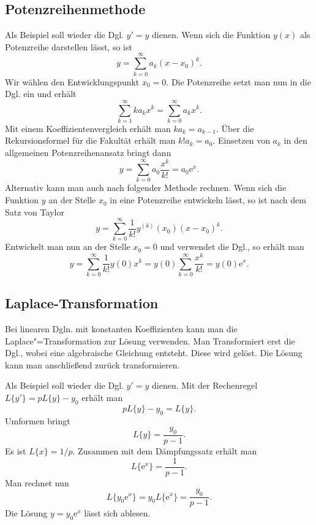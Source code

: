 \documentclass[a4paper,11pt,fleqn,twocolumn,twoside,openany]{scrartcl}
\numberwithin{equation}{section}
\newcommand{\ee}{\mathrm e}
\theoremstyle{defstyle}
\numberwithin{Definition}{section}
\begin{document}
\subsection{Potenzreihenmethode}

Als Beispiel soll wieder die Dgl. $y'=y$ dienen.
Wenn sich die Funktion $y(x)$ als Potenzreihe darstellen lässt, so ist%
\begin{equation}
y=\sum_{k=0}^\infty a_k(x-x_0)^k.
\end{equation}
Wir wählen den Entwicklungspunkt $x_0=0$. Die Potenzreihe setzt man
nun in die Dgl. ein und erhält%
\begin{equation}
\sum_{k=1}^\infty ka_kx^k = \sum_{k=0}^\infty a_kx^k.
\end{equation}
Mit einem Koeffizientenvergleich erhält man $ka_k=a_{k-1}$.
Über die Rekursionsformel für die Fakultät erhält man $k!a_k=a_0$.
Einsetzen von $a_k$ in den allgemeinen Potenzreihenansatz bringt dann%
\begin{equation}
y=\sum_{k=0}^\infty a_0\frac{x^k}{k!} = a_0\ee^x.
\end{equation}
Alternativ kann man auch nach folgender Methode rechnen.
Wenn sich die Funktion $y$ an der Stelle $x_0$ in eine Potenzreihe
entwickeln lässt, so ist nach dem Satz von Taylor%
\begin{equation}
y = \sum_{k=0}^\infty \frac{1}{k!}y^{(k)}(x_0)(x-x_0)^k.
\end{equation}
Entwickelt man nun an der Stelle $x_0=0$ und verwendet die Dgl.,
so erhält man%
\begin{equation}
y = \sum_{k=0}^\infty \frac{1}{k!}y(0)x^k
= y(0)\sum_{k=0}^\infty \frac{x^k}{k!}
= y(0)\ee^x.
\end{equation}

\subsection{Laplace-Transformation}

Bei linearen Dgln. mit konstanten Koeffizienten kann man die
Laplace"=Transformation zur Lösung verwenden. Man Transformiert
erst die Dgl., wobei eine algebraische Gleichung entsteht. Diese
wird gelöst. Die Lösung kann man anschließend zurück transformieren.

Als Beispiel soll wieder die Dgl. $y'=y$ dienen. Mit der Rechenregel
$L\{y'\} = pL\{y\}-y_0$ erhält man%
\begin{equation}
pL\{y\}-y_0 = L\{y\}.
\end{equation}
Umformen bringt
\begin{equation}
L\{y\} = \frac{y_0}{p-1}.
\end{equation}
Es ist $L\{x\} = 1/p$. Zusammen mit dem Dämpfungssatz erhält man%
\begin{equation}
L\{\ee^x\} = \frac{1}{p-1}.
\end{equation}
Man rechnet nun
\begin{equation}
L\{y_0\ee^x\} = y_0L\{\ee^x\} = \frac{y_0}{p-1}.
\end{equation}
Die Lösung $y=y_0\ee^x$ lässt sich ablesen.
\end{document}
